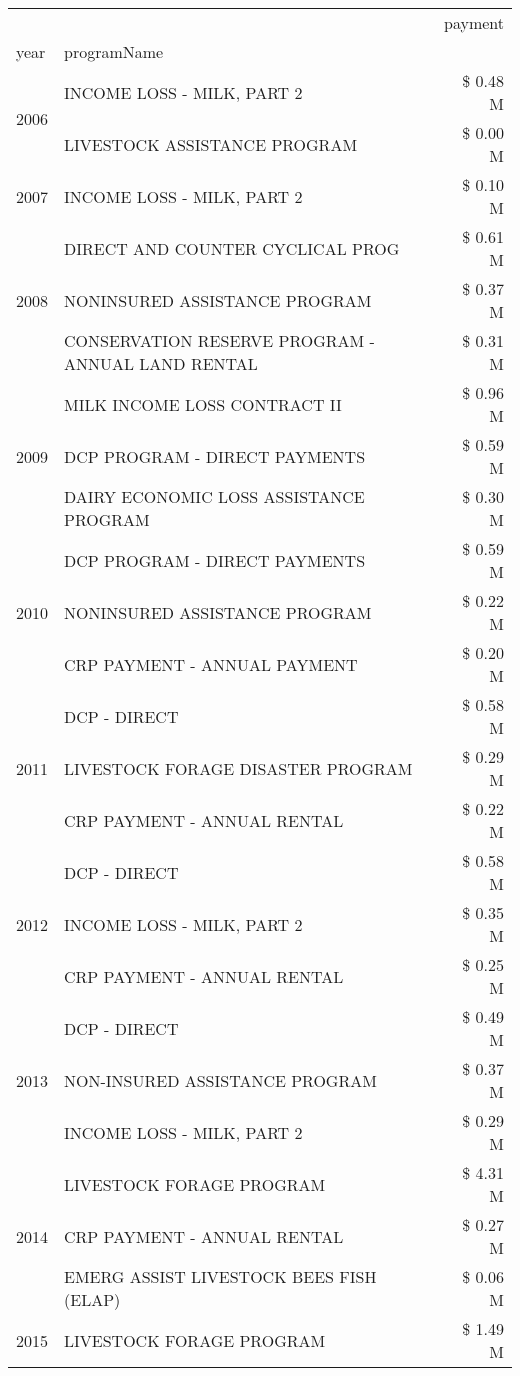 \begin{tabular}{llr}
\toprule
 &  & payment \\
year & programName &  \\
\midrule
\multirow[t]{2}{*}{2006} & INCOME LOSS - MILK, PART 2 & \$ 0.48 M \\
 & LIVESTOCK ASSISTANCE PROGRAM & \$ 0.00 M \\
\cline{1-3}
2007 & INCOME LOSS - MILK, PART 2 & \$ 0.10 M \\
\cline{1-3}
\multirow[t]{3}{*}{2008} & DIRECT AND COUNTER CYCLICAL PROG & \$ 0.61 M \\
 & NONINSURED ASSISTANCE PROGRAM & \$ 0.37 M \\
 & CONSERVATION RESERVE PROGRAM - ANNUAL LAND RENTAL & \$ 0.31 M \\
\cline{1-3}
\multirow[t]{3}{*}{2009} & MILK INCOME LOSS CONTRACT II & \$ 0.96 M \\
 & DCP PROGRAM - DIRECT PAYMENTS & \$ 0.59 M \\
 & DAIRY ECONOMIC LOSS ASSISTANCE PROGRAM & \$ 0.30 M \\
\cline{1-3}
\multirow[t]{3}{*}{2010} & DCP PROGRAM - DIRECT PAYMENTS & \$ 0.59 M \\
 & NONINSURED ASSISTANCE PROGRAM & \$ 0.22 M \\
 & CRP PAYMENT - ANNUAL PAYMENT & \$ 0.20 M \\
\cline{1-3}
\multirow[t]{3}{*}{2011} & DCP - DIRECT & \$ 0.58 M \\
 & LIVESTOCK FORAGE DISASTER PROGRAM & \$ 0.29 M \\
 & CRP PAYMENT - ANNUAL RENTAL & \$ 0.22 M \\
\cline{1-3}
\multirow[t]{3}{*}{2012} & DCP - DIRECT & \$ 0.58 M \\
 & INCOME LOSS - MILK, PART 2 & \$ 0.35 M \\
 & CRP PAYMENT - ANNUAL RENTAL & \$ 0.25 M \\
\cline{1-3}
\multirow[t]{3}{*}{2013} & DCP - DIRECT & \$ 0.49 M \\
 & NON-INSURED ASSISTANCE PROGRAM & \$ 0.37 M \\
 & INCOME LOSS - MILK, PART 2 & \$ 0.29 M \\
\cline{1-3}
\multirow[t]{3}{*}{2014} & LIVESTOCK FORAGE PROGRAM & \$ 4.31 M \\
 & CRP PAYMENT - ANNUAL RENTAL & \$ 0.27 M \\
 & EMERG ASSIST LIVESTOCK BEES FISH (ELAP) & \$ 0.06 M \\
\cline{1-3}
\multirow[t]{3}{*}{2015} & LIVESTOCK FORAGE PROGRAM & \$ 1.49 M \\

\end{tabular}
